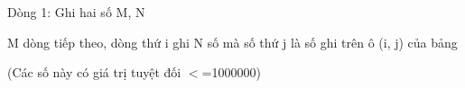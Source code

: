 Dòng 1: Ghi hai số M, N

M dòng tiếp theo, dòng thứ i ghi N số mà số thứ j là số ghi trên ô (i, j) của bảng

(Các số này có giá trị tuyệt đối $<$=1000000)